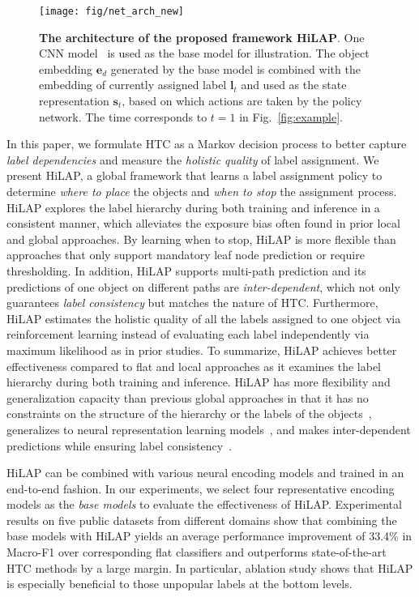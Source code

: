 \documentclass[11pt,a4paper]{article}
\begin{document}
\begin{figure*}[ht]
    \centering
    \texttt{[image: fig/net\_arch\_new]}
     \caption{\textbf{The architecture of the proposed framework HiLAP}. One CNN model~\citep{kim2014convolutional} is used as the base model for illustration. The object embedding $\textbf{e}_d$ generated by the base model is combined with the embedding of currently assigned label $\textbf{l}_t$ and used as the state representation $\textbf{s}_t$, based on which actions are taken by the policy network. The time corresponds to $t=1$ in Fig.~\ref{fig:example}.}
    \label{fig:net_arch}
    \vspace*{-.1cm}
\end{figure*}



In this paper, we formulate HTC as a Markov decision process to better capture \textit{label dependencies} and measure the \textit{holistic quality} of label assignment.
We present HiLAP, a global framework that learns a label assignment policy to determine \textit{where to place} the objects and \textit{when to stop} the assignment process.
HiLAP explores the label hierarchy during both training and inference in a consistent manner, which alleviates the exposure bias often found in prior local and global approaches.
By learning when to stop, HiLAP is more flexible than approaches that only support mandatory leaf node prediction or require thresholding.
In addition, HiLAP supports multi-path prediction and its predictions of one object on different paths are \textit{inter-dependent}, which not only guarantees \textit{label consistency} but matches the nature of HTC.
Furthermore, HiLAP estimates the holistic quality of all the labels assigned to one object via reinforcement learning instead of evaluating each label independently via maximum likelihood as in prior studies.
To summarize, HiLAP achieves better effectiveness compared to flat and local approaches as it examines the label hierarchy during both training and inference.
HiLAP has more flexibility and generalization capacity than previous global approaches in that it has no constraints on the structure of the hierarchy or the labels of the objects~\citep{cai2004hierarchical}, generalizes to neural representation learning models~\citep{gopal2013recursive}, and makes inter-dependent predictions while ensuring label consistency~\citep{wehrmann2018hierarchical,peng2018large}.


HiLAP can be combined with various neural encoding models and trained in an end-to-end fashion.
In our experiments, we select four representative encoding models as the \textit{base models} to evaluate the effectiveness of HiLAP.
Experimental results on five public datasets from different domains show that combining the base models with HiLAP yields an average performance improvement of 33.4\% in Macro-F1 over corresponding flat classifiers and outperforms state-of-the-art HTC methods by a large margin.
In particular, ablation study shows that HiLAP is especially beneficial to those unpopular labels at the bottom levels.
\end{document}
